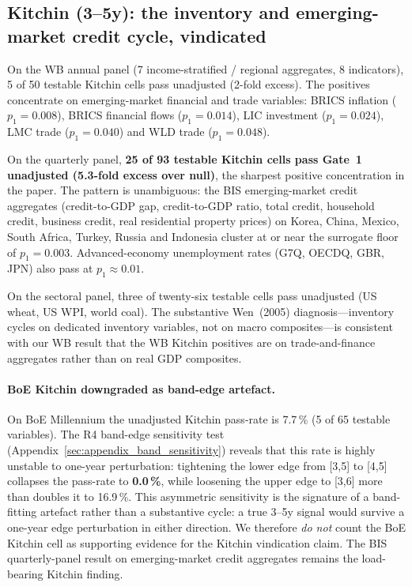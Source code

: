 \subsection{Kitchin (3--5y): the inventory and emerging-market credit cycle, vindicated}
\label{sec:kitchin_results}

On the WB annual panel (7 income-stratified / regional
aggregates, 8 indicators), 5 of 50 testable Kitchin cells pass
unadjusted (2-fold excess). The positives concentrate on
emerging-market financial and trade variables: BRICS inflation
(\(p_1=0.008\)), BRICS financial flows (\(p_1=0.014\)), LIC
investment (\(p_1=0.024\)), LMC trade (\(p_1=0.040\))
and WLD trade (\(p_1=0.048\)).

On the quarterly panel, \textbf{25 of 93 testable Kitchin
cells pass Gate~1 unadjusted (5.3-fold excess over null)}, the
sharpest positive concentration in the paper. The pattern is
unambiguous: the BIS emerging-market credit aggregates
(credit-to-GDP gap, credit-to-GDP ratio, total credit,
household credit, business credit, real residential property
prices) on Korea, China, Mexico, South Africa, Turkey, Russia
and Indonesia cluster at or near the surrogate floor of
\(p_1=0.003\). Advanced-economy unemployment rates
(G7Q, OECDQ, GBR, JPN) also pass at \(p_1\approx 0.01\).

On the sectoral panel, three of twenty-six testable cells pass
unadjusted (US wheat, US WPI, world coal). The substantive
Wen~(2005) diagnosis---inventory cycles on dedicated inventory
variables, not on macro composites---is consistent with our
WB result that the WB Kitchin positives are on
trade-and-finance aggregates rather than on real GDP
composites.

\paragraph{BoE Kitchin downgraded as band-edge artefact.}
On BoE Millennium the unadjusted Kitchin pass-rate is
7.7\,\% (5 of 65 testable variables). The R4 band-edge
sensitivity test (Appendix~\ref{sec:appendix_band_sensitivity})
reveals that this rate is highly unstable to one-year
perturbation: tightening the lower edge from [3,5] to [4,5]
collapses the pass-rate to \textbf{0.0\,\%}, while loosening
the upper edge to [3,6] more than doubles it to 16.9\,\%.
This asymmetric sensitivity is the signature of a
band-fitting artefact rather than a substantive cycle: a
true 3--5y signal would survive a one-year edge perturbation
in either direction. We therefore \emph{do not} count the
BoE Kitchin cell as supporting evidence for the Kitchin
vindication claim. The BIS quarterly-panel result on
emerging-market credit aggregates remains the load-bearing
Kitchin finding.

